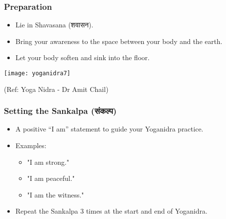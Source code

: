 \begin{frame}[fragile]\frametitle{Preparation}
    \begin{itemize}
        \item Lie in Shavasana (शवासन).
        \item Bring your awareness to the space between your body and the earth.
        \item Let your body soften and sink into the floor.    
	\end{itemize}
	
      \begin{center}
        \texttt{[image: yoganidra7]}

		{\tiny (Ref: Yoga Nidra - Dr Amit Chail)}		
        \end{center}	
\end{frame}

\begin{frame}[fragile]\frametitle{Setting the Sankalpa (संकल्प)}
    \begin{itemize}
        \item A positive “I am” statement to guide your Yoganidra practice.
        \item Examples:
        \begin{itemize}
            \item "I am strong."
            \item "I am peaceful."
            \item "I am the witness."
        \end{itemize}
        \item Repeat the Sankalpa 3 times at the start and end of Yoganidra.
    \end{itemize}
\end{frame}

